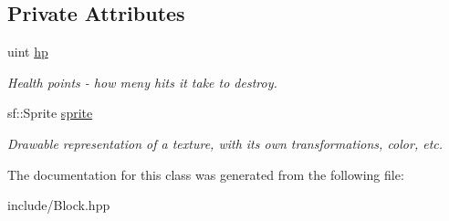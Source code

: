 \subsection*{Private Attributes}
\begin{DoxyCompactItemize}
\item 
\mbox{\label{class_block_a8b1d6db0268d1e54f55c8824cbb429f2}} 
uint \mbox{\hyperlink{class_block_a8b1d6db0268d1e54f55c8824cbb429f2}{hp}}
\begin{DoxyCompactList}\small\item\em Health points -\/ how meny hits it take to destroy. \end{DoxyCompactList}\item 
\mbox{\label{class_block_a0fb8279435ff1a353df3170f26428bff}} 
sf\+::\+Sprite \mbox{\hyperlink{class_block_a0fb8279435ff1a353df3170f26428bff}{sprite}}
\begin{DoxyCompactList}\small\item\em Drawable representation of a texture, with its own transformations, color, etc. \end{DoxyCompactList}\end{DoxyCompactItemize}


The documentation for this class was generated from the following file\+:\begin{DoxyCompactItemize}
\item 
include/Block.\+hpp\end{DoxyCompactItemize}
